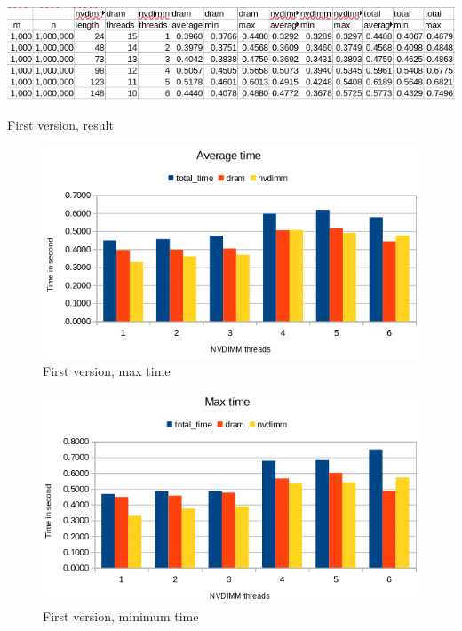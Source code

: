 \documentclass[12pt,a4paper,USenglish]{article}      %
\begin{document}
\begin{table}[!hbtp]
\includegraphics[scale=0.6]{Large_Array_test/First_version_1k_1000k_Table.png}
\caption{First version, result}
\end{table}

\begin{figure}[!hbtp]
\includegraphics[scale=0.7]{Large_Array_test/First_version_1k_1000k_average.png}
\caption{First version, max time}
\end{figure}

\begin{figure}[!hbtp]
\includegraphics[scale=0.7]{Large_Array_test/First_version_1k_1000k_MaxTime.png}
\caption{First version, minimum time}
\end{figure}
\end{document}
